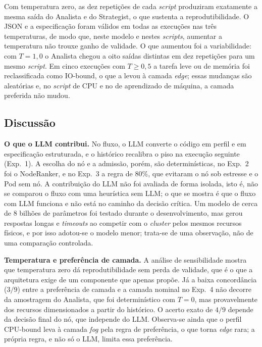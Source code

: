 \documentclass[11pt,a4paper]{article}
\begin{document}
Com temperatura zero, as dez repetições de cada \textit{script} produziram
exatamente a mesma saída do Analista e do Strategist, o que sustenta a
reprodutibilidade. O JSON e a especificação foram válidos em todas as
execuções nas três temperaturas, de modo que, neste modelo e nestes
\textit{scripts}, aumentar a temperatura não trouxe ganho de validade. O que
aumentou foi a variabilidade: com $T=1{,}0$ o Analista chegou a oito saídas
distintas em dez repetições para um mesmo \textit{script}. Em cinco
execuções com $T\geq 0{,}5$ a tarefa leve ou de memória foi reclassificada
como IO-bound, o que a levou à camada \textit{edge}; essas mudanças são
aleatórias e, no \textit{script} de CPU e no de aprendizado de máquina, a
camada preferida não mudou.

\subsection{Discussão}

\textbf{O que o LLM contribui.} No fluxo, o LLM converte o código em perfil e
em especificação estruturada, e o histórico recalibra o piso na execução
seguinte (Exp.~1). A escolha do nó e a admissão, porém, são determinísticas,
no Exp.~2 foi o NodeRanker, e no Exp.~3 a regra de $80\%$, que evitaram o nó
sob estresse e o Pod sem nó. A contribuição do LLM não foi avaliada de forma isolada, isto é, não se comparou o fluxo com uma heurística sem LLM; o que se
mostra é que o fluxo com LLM funciona e não está no caminho da
decisão crítica. Um modelo de cerca de $8$ bilhões de parâmetros foi testado
durante o desenvolvimento, mas gerou respostas longas e \textit{timeouts} ao
competir com o \textit{cluster} pelos mesmos recursos físicos, e por isso
adotou-se o modelo menor; trata-se de uma observação, não de uma comparação
controlada.

\textbf{Temperatura e preferência de camada.} A análise de sensibilidade
mostra que temperatura zero dá reprodutibilidade sem perda de validade, que
é o que a arquitetura exige de um componente que apenas propõe. Já a
baixa concordância ($3/9$) entre a preferência de camada e a camada nominal
no Exp.~4 não decorre da amostragem do Analista, que foi determinístico com
$T=0$, mas provavelmente dos recursos dimensionados a partir do histórico.
O acerto exato de $4/9$ depende da decisão final do nó, que independe do
LLM. Observa-se ainda que o perfil CPU-bound leva à camada
\textit{fog} pela regra de preferência, o que torna \textit{edge} rara; a
própria regra, e não só o LLM, limita essa preferência.
\end{document}
